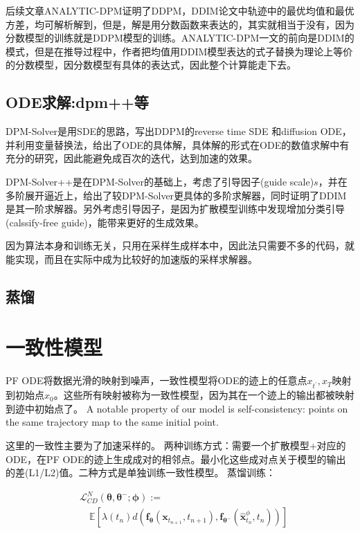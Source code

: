 后续文章ANALYTIC-DPM证明了DDPM，DDIM论文中轨迹中的最优均值和最优方差，均可解析解到，但是，解是用分数函数来表达的，其实就相当于没有，因为分数模型的训练就是DDPM模型的训练。ANALYTIC-DPM一文的前向是DDIM的模式，但是在推导过程中，作者把均值用DDIM模型表达的式子替换为理论上等价的分数模型，因分数模型有具体的表达式，因此整个计算能走下去。

\subsection{ODE求解:dpm++等}
DPM-Solver是用SDE的思路，写出DDPM的reverse time SDE 和diffusion  ODE，并利用变量替换法，给出了ODE的具体解，具体解的形式在ODE的数值求解中有充分的研究，因此能避免成百次的迭代，达到加速的效果。

DPM-Solver++是在DPM-Solver的基础上，考虑了引导因子(guide scale)$s$，并在多阶展开逼近上，给出了较DPM-Solver更具体的多阶求解器，同时证明了DDIM是其一阶求解器。另外考虑引导因子，是因为扩散模型训练中发现增加分类引导(calssify-free guide)，能带来更好的生成效果。

因为算法本身和训练无关，只用在采样生成样本中，因此法只需要不多的代码，就能实现，而且在实际中成为比较好的加速版的采样求解器。
\subsection{蒸馏}


\section{一致性模型}
PF ODE将数据光滑的映射到噪声，一致性模型将ODE的迹上的任意点$x_{t^{\prime}}, x_T$映射到初始点$x_0$。这些所有映射被称为一致性模型，因为其在一个迹上的输出都被映射到迹中初始点了。 A notable property of our model is self-consistency: points on the same trajectory map to the same initial point.

这里的一致性主要为了加速采样的。
两种训练方式：需要一个扩散模型+对应的ODE，在PF ODE的迹上生成成对的相邻点。最小化这些成对点关于模型的输出的差(L1/L2)值。二种方式是单独训练一致性模型。
蒸馏训练：

$$\begin{aligned} & \mathcal{L}_{C D}^N\left(\boldsymbol{\theta}, \boldsymbol{\theta}^{-} ; \boldsymbol{\phi}\right):= \\ & \quad \mathbb{E}\left[\lambda\left(t_n\right) d\left(\boldsymbol{f}_{\boldsymbol{\theta}}\left(\mathbf{x}_{t_{n+1}}, t_{n+1}\right), \boldsymbol{f}_{\boldsymbol{\theta}^{-}}\left(\hat{\mathbf{x}}_{t_n}^\phi, t_n\right)\right)\right]\end{aligned}$$

